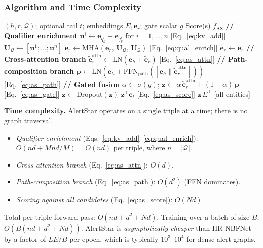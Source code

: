 \documentclass[10pt,journal,compsoc]{IEEEtran}
\begin{document}
\subsubsection{Algorithm and Time Complexity}
\label{sssec:as_complexity}

\begin{algorithm}[t]
\caption{AlertStar: Forward Pass}
\label{alg:alertstar}
\begin{algorithmic}[1]
\Require $(h, r, \mathcal{Q})$;
  optional tail $t$;
  embeddings $E, \mathbf{e}_r$;
  gate scalar $g$
\Ensure Score(s) $f_{\mathrm{AS}}$
\State \textbf{// Qualifier enrichment}
  \State $\mathbf{u}^i \leftarrow
    \mathbf{e}_{q_k^i} + \mathbf{e}_{q_v^i}$
    for $i=1,\ldots,n$
    \hfill [Eq.~\ref{eq:kv_add}]
  \State $\mathbf{U}_{\mathcal{Q}} \leftarrow
    [\mathbf{u}^1;\ldots;\mathbf{u}^n]$
  \State $\tilde{\mathbf{e}}_r \leftarrow
    \mathrm{MHA}(\mathbf{e}_r,\,
    \mathbf{U}_{\mathcal{Q}},\,
    \mathbf{U}_{\mathcal{Q}})$
    \hfill [Eq.~\ref{eq:qual_enrich}]
\Else
  \State $\tilde{\mathbf{e}}_r \leftarrow \mathbf{e}_r$
\EndIf
\State \textbf{// Cross-attention branch}
\State $\tilde{\mathbf{e}}_r^{\mathrm{attn}} \leftarrow
  \mathrm{LN}(\mathbf{e}_h + \tilde{\mathbf{e}}_r)$
  \hfill [Eq.~\ref{eq:as_attn}]
\State \textbf{// Path-composition branch}
\State $\mathbf{p} \leftarrow
  \mathrm{LN}(\mathbf{e}_h +
  \mathrm{FFN}_{\mathrm{path}}(
  [\mathbf{e}_h \| \tilde{\mathbf{e}}_r^{\mathrm{attn}}]))$
  \hfill [Eq.~\ref{eq:as_path}]
\State \textbf{// Gated fusion}
\State $\alpha \leftarrow \sigma(g)$;\;
  $\mathbf{z} \leftarrow
  \alpha\,\tilde{\mathbf{e}}_r^{\mathrm{attn}}
  + (1{-}\alpha)\,\mathbf{p}$
  \hfill [Eq.~\ref{eq:as_gate}]
\State $\mathbf{z} \leftarrow \mathrm{Dropout}(\mathbf{z})$
  \State \Return $\mathbf{z}^{\top} \mathbf{e}_t$
  \hfill [Eq.~\ref{eq:as_score}]
\Else
  \State \Return $\mathbf{z}\,E^{\top}$
  \hfill [all entities]
\EndIf
\end{algorithmic}
\end{algorithm}

\noindent\textbf{Time complexity.}
AlertStar operates on a single triple at a time;
there is no graph traversal.
\begin{itemize}
  \item \emph{Qualifier enrichment}
    (Eqs.~\ref{eq:kv_add}--\ref{eq:qual_enrich}):
    $O(n d + M n d / M) = O(n d)$
    per triple, where $n = |\mathcal{Q}|$.
  \item \emph{Cross-attention branch}
    (Eq.~\ref{eq:as_attn}): $O(d)$.
  \item \emph{Path-composition branch}
    (Eq.~\ref{eq:as_path}): $O(d^2)$ (FFN dominates).
  \item \emph{Scoring against all candidates}
    (Eq.~\ref{eq:as_score}): $O(N d)$.
\end{itemize}
Total per-triple forward pass: $O(n d + d^2 + N d)$.
Training over a batch of size $B$:
$O(B (n d + d^2 + N d))$.
AlertStar is \emph{asymptotically cheaper} than
HR-NBFNet by a factor of $L E / B$ per epoch,
which is typically $10^3$--$10^4$ for dense alert graphs.
\end{document}
